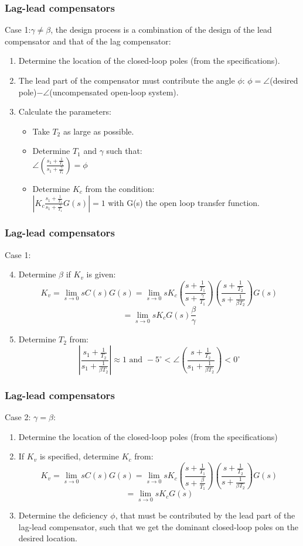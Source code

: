 \begin{frame}
	\frametitle{Lag-lead compensators}
	Case 1:$\gamma\neq \beta$,  the design process is a combination of the design of the lead compensator and that of the lag compensator:
	\begin{enumerate}
		\item Determine the location of the closed-loop poles (from the specifications).
		\item The lead part of the compensator must contribute the angle $\phi$: $\phi=\angle$(desired pole)$-\angle$(uncompensated open-loop system).
		\item Calculate the parameters:
		\begin{itemize}
			\item Take $T_2$ as large as possible.
			\item Determine $T_1$ and $\gamma$ such that:\\ 
			$\angle(\frac{s_1+\frac{1}{T_1}}{s_1+\frac{\gamma}{T_1}})=\phi$
			\item Determine $K_c$ from the condition:\\
			$|K_c\frac{s_1+\frac{1}{T_1}}{s_1+\frac{\gamma}{T_1}}G(s)|=1$ with G(s) the open loop transfer function.
		\end{itemize}
	\end{enumerate}
\end{frame}

\begin{frame}
	\frametitle{Lag-lead compensators}
	Case 1:
	\begin{enumerate}
		\setcounter{enumi}{3}
		\item Determine $\beta$ if $K_v$ is given:
		$$K_v=\lim_{s\to0}sC(s)G(s)=\lim_{s\to 0}sK_c\left(\frac{s+\frac{1}{T_1}}{s+\frac{\gamma}{T_1}}\right)
		\left(\frac{s+\frac{1}{T_2}}{s+\frac{1}{\beta T_2}}\right)G(s)$$
		$$=\lim_{s\to0}sK_cG(s)\frac{\beta}{\gamma}$$
		\item Determine $T_2$ from:\\
		$$|\frac{s_1+\frac{1}{T_2}}{s_1+\frac{1}{\beta T_2}}|\approx 1 \text{ and } -5^{\circ}<\angle\left(\frac{s+\frac{1}{T_2}}{s_1+\frac{1}{\beta T_2}}\right)<0^{\circ}$$
	\end{enumerate}
\end{frame}

\begin{frame}
	\frametitle{Lag-lead compensators}
	Case 2: $\gamma= \beta$:
	\begin{enumerate}
		\item Determine the location of the closed-loop poles (from the specifications)
		\item If $K_v$ is specified, determine $K_c$ from:\\
		$$K_v=\lim_{s \to 0} sC(s)G(s)=\lim_{s\to 0}sK_c\left(\frac{s+\frac{1}{T_1}}{s+\frac{\beta}{T_1}}\right)
		\left(\frac{s+\frac{1}{T_2}}{s+\frac{1}{\beta T_2}}\right)G(s)$$
		$$=\lim_{s\to0}sK_cG(s)$$\item Determine the deficiency $\phi$, that must be contributed by the lead part of the lag-lead compensator, such that we get the dominant closed-loop poles on the desired location. 
	\end{enumerate}
\end{frame}

